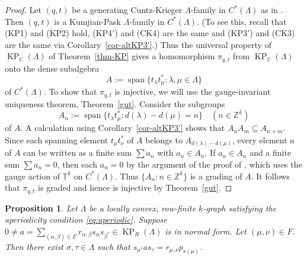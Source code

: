 \documentclass[a4paper,12pt]{amsart}
\numberwithin{equation}{section}
\newtheorem{prop}[thm]{Proposition}
\theoremstyle{definition}
\theoremstyle{remark}
\begin{document}
\begin{proof}
 Let $(q,t)$ be a generating Cuntz-Krieger $\Lambda$-family in $C^*(\Lambda)$ as in \cite[Definition~3.3]{RSY03}.  Then $(q,t)$ is  a Kumjian-Pask $\Lambda$-family 
in $C^*(\Lambda)$. (To see this, recall that (KP1) and 
(KP2) hold, (KP4$'$) and (CK4) are the same and (KP3$'$) and (CK3) are the same via Corollary~\ref{cor-altKP3'}.)  Thus the universal property of 
$\operatorname{KP}_{\mathbb{C}}(\Lambda)$ of Theorem~\ref{thm-KP} gives  a homomorphism $\pi_{q,t}$ from $\operatorname{KP}_{\mathbb{C}}(\Lambda)$ onto the dense 
subalgebra \[A:={\operatorname{\mathrm{span}}} \{t_{\lambda}t_{\mu}^*:\lambda, \mu \in \Lambda\}\]
of $C^*(\Lambda)$.
To show that $\pi_{q,t}$ is injective, we will use the gauge-invariant uniqueness theorem, Theorem~\ref{gut}. 
Consider the subgroups \[
 A_n:= {\operatorname{\mathrm{span}}}\{t_{\lambda}t_{\mu}^*:d(\lambda)- d(\mu)=n\}\quad(n\in{\mathbb{Z}}^k)\]
of $A$. A calculation using Corollary~\ref{cor-altKP3'} shows that $A_nA_m \subseteq A_{n+m}$. 
Since each spanning element $t_\mu t_{\nu}^*$ of $A$ belongs to $A_{d(\lambda)-d(\mu)}$, every element $a$ of $A$ can be written as a finite sum $\sum a_n$ with $a_n\in A_n$.  If $a_n\in A_n$ and  a finite sum $\sum a_n=0$, then each $a_n=0$ by the argument of the proof of \cite[Lemma~7.4]{ACaHR}, which uses the gauge action  of ${\mathbb{T}}^k$ on $C^*(\Lambda)$. Thus $\{A_n:n\in{\mathbb{Z}}^k\}$ is a grading of $A$.  It follows that 
$\pi_{q,t}$ is graded and hence is injective by Theorem~\ref{gut}.
\end{proof}

\begin{prop}
 \label{prop:aperiodic}
Let $\Lambda$ be a locally convex, row-finite  $k$-graph satisfying the aperiodicity condition \eqref{eq:aperiodic}.
Suppose $0\neq a=\sum_{(\alpha,\beta) \in F} 
r_{\alpha,\beta}s_\alpha s_{\beta^*}\in \operatorname{KP}_R(\Lambda)$ is in normal form. Let $(\mu, \nu) \in F$.
Then there exist $\sigma, \tau \in \Lambda$  such 
that $s_{\sigma^*}as_\tau=r_{\mu,\nu}p_{s(\mu)}$.
\end{prop}
\end{document}
